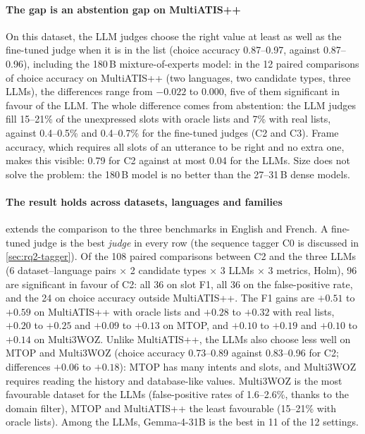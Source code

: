 \paragraph{The gap is an abstention gap on MultiATIS++} On this dataset, the LLM judges choose the right value at least as well as the fine-tuned judge when it is in the list (choice accuracy 0.87--0.97, against 0.87--0.96), including the 180\,B mixture-of-experts model: in the 12 paired comparisons of choice accuracy on MultiATIS++ (two languages, two candidate types, three LLMs), the differences range from $-0.022$ to $0.000$, five of them significant in favour of the LLM. The whole difference comes from abstention: the LLM judges fill 15--21\% of the unexpressed slots with oracle lists and 7\% with real lists, against 0.4--0.5\% and 0.4--0.7\% for the fine-tuned judges (C2 and C3). Frame accuracy, which requires all slots of an utterance to be right and no extra one, makes this visible: 0.79 for C2 against at most 0.04 for the LLMs. Size does not solve the problem: the 180\,B model is no better than the 27--31\,B dense models.

\paragraph{The result holds across datasets, languages and families}  extends the comparison to the three benchmarks in English and French. A fine-tuned judge is the best \emph{judge} in every row (the sequence tagger C0 is discussed in \cref{sec:rq2-tagger}). Of the 108 paired comparisons between C2 and the three LLMs (6 dataset--language pairs $\times$ 2 candidate types $\times$ 3 LLMs $\times$ 3 metrics, Holm), 96 are significant in favour of C2: all 36 on slot F1, all 36 on the false-positive rate, and the 24 on choice accuracy outside MultiATIS++. The F1 gains are $+0.51$ to $+0.59$ on MultiATIS++ with oracle lists and $+0.28$ to $+0.32$ with real lists, $+0.20$ to $+0.25$ and $+0.09$ to $+0.13$ on MTOP, and $+0.10$ to $+0.19$ and $+0.10$ to $+0.14$ on Multi3WOZ. Unlike MultiATIS++, the LLMs also choose less well on MTOP and Multi3WOZ (choice accuracy 0.73--0.89 against 0.83--0.96 for C2; differences $+0.06$ to $+0.18$): MTOP has many intents and slots, and Multi3WOZ requires reading the history and database-like values. Multi3WOZ is the most favourable dataset for the LLMs (false-positive rates of 1.6--2.6\%, thanks to the domain filter), MTOP and MultiATIS++ the least favourable (15--21\% with oracle lists). Among the LLMs, Gemma-4-31B is the best in 11 of the 12 settings.

